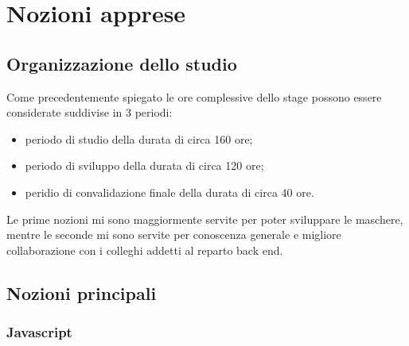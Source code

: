 
\chapter{Nozioni apprese}
\label{cap:nozioni-apprese}


\section{Organizzazione dello studio}

Come precedentemente spiegato le ore complessive dello stage possono essere considerate suddivise in 3 periodi:
\begin{itemize}
	\item periodo di studio della durata di circa 160 ore;
	\item periodo di sviluppo della durata di circa 120 ore;
	\item peridio di convalidazione finale della durata di circa 40 ore.
\end{itemize}
Le prime nozioni mi sono maggiormente servite per poter sviluppare le maschere, mentre le seconde mi sono servite per conoscenza generale e migliore collaborazione con i colleghi addetti al reparto back end.

\section{Nozioni principali}

\subsection{Javascript}

